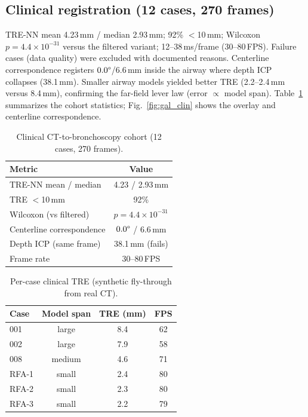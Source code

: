 \documentclass[9pt,twoside,web]{ieeecolor2}
\begin{document}
\subsection{Clinical registration (12 cases, 270 frames)}
TRE-NN mean 4.23\,mm / median 2.93\,mm; 92\% $<$10\,mm; Wilcoxon $p=4.4\times10^{-31}$ versus the filtered variant; 12--38\,ms/frame (30--80\,FPS). Failure cases (data quality) were excluded with documented reasons. Centerline correspondence registers $0.0\degree$/6.6\,mm inside the airway where depth ICP collapses (38.1\,mm). Smaller airway models yielded better TRE (2.2--2.4\,mm versus 8.4\,mm), confirming the far-field lever law (error $\propto$ model span). Table~\ref{tab:clinical} summarizes the cohort statistics; Fig.~\ref{fig:gal_clin} shows the overlay and centerline correspondence.

\begin{table}[t]
\centering
\caption{Clinical CT-to-bronchoscopy cohort (12 cases, 270 frames).}
\label{tab:clinical}
\begin{tabular}{lc}
\toprule
Metric & Value \\
\midrule
TRE-NN mean / median & 4.23 / 2.93\,mm \\
TRE $<$10\,mm & 92\% \\
Wilcoxon (vs filtered) & $p=4.4\times10^{-31}$ \\
Centerline correspondence & $0.0\degree$ / 6.6\,mm \\
Depth ICP (same frame) & 38.1\,mm (fails) \\
Frame rate & 30--80\,FPS \\
\bottomrule
\end{tabular}
\end{table}

\begin{table}[t]
\centering
\caption{Per-case clinical TRE (synthetic fly-through from real CT).}
\label{tab:percase}
\setlength{\tabcolsep}{5pt}\small
\begin{tabular}{lccc}
\toprule
Case & Model span & TRE (mm) & FPS \\
\midrule
001 & large & 8.4 & 62 \\
002 & large & 7.9 & 58 \\
008 & medium & 4.6 & 71 \\
RFA-1 & small & 2.4 & 80 \\
RFA-2 & small & 2.3 & 80 \\
RFA-3 & small & 2.2 & 79 \\
\bottomrule
\end{tabular}
\end{table}
\end{document}
